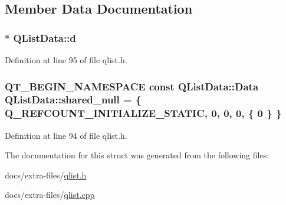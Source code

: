 \subsection{Member Data Documentation}
\subsubsection[{\texorpdfstring{d}{d}}]{$\ast$ Q\+List\+Data\+::d}\hypertarget{struct_q_list_data_a8f001fb63f7810449d3409f7bed6ec73}{}\label{struct_q_list_data_a8f001fb63f7810449d3409f7bed6ec73}


Definition at line 95 of file qlist.\+h.

\subsubsection[{\texorpdfstring{shared\+\_\+null}{shared_null}}]{\setlength{\rightskip}{0pt plus 5cm}Q\+T\+\_\+\+B\+E\+G\+I\+N\+\_\+\+N\+A\+M\+E\+S\+P\+A\+CE const {\bf Q\+List\+Data\+::\+Data} Q\+List\+Data\+::shared\+\_\+null = \{ Q\+\_\+\+R\+E\+F\+C\+O\+U\+N\+T\+\_\+\+I\+N\+I\+T\+I\+A\+L\+I\+Z\+E\+\_\+\+S\+T\+A\+T\+IC, 0, 0, 0, \{ 0 \} \}\hspace{0.3cm}{\ttfamily [static]}}\hypertarget{struct_q_list_data_a4dad6e2c5b5f1d92b5cc0fdd308b553a}{}\label{struct_q_list_data_a4dad6e2c5b5f1d92b5cc0fdd308b553a}


Definition at line 94 of file qlist.\+h.



The documentation for this struct was generated from the following files\+:\begin{DoxyCompactItemize}
\item 
docs/extra-\/files/\hyperlink{qlist_8h}{qlist.\+h}\item 
docs/extra-\/files/\hyperlink{qlist_8cpp}{qlist.\+cpp}\end{DoxyCompactItemize}
